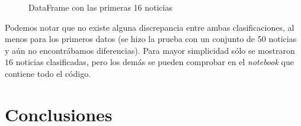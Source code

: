 \documentclass[letterpaper,11pt]{article}
\begin{document}
\begin{figure}[ht]
    \centering
    \qquad
    \caption{DataFrame con las primeras 16 noticias}
\end{figure}

Podemos notar que no existe alguna discrepancia entre ambas clasificaciones, 
al menos para los primeros datos (se hizo la prueba con un conjunto de 50
noticias y aún no encontrábamos diferencias). Para mayor simplicidad sólo 
se mostraron $16$ noticias clasificadas, pero los demás se pueden comprobar 
en el \textit{notebook} que contiene todo el código.

\section{Conclusiones}
\end{document}
